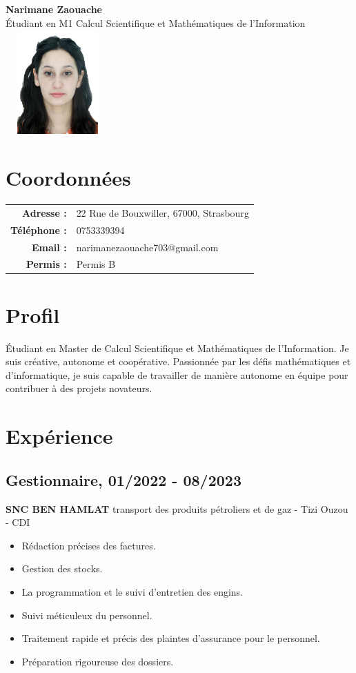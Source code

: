 \documentclass[a4paper,10pt]{article}
\begin{document}
\begin{center}
    \Huge{\textbf{Narimane Zaouache}} \\
    \large{Étudiant en M1 Calcul Scientifique et Mathématiques de l'Information} \\
    \vspace{0.2em}
    \includegraphics[width=4cm, height=4cm]{profile_image.jpg} %
\end{center}

\section*{Coordonnées}
\begin{tabular}{rl}
    \textbf{Adresse :} & 22 Rue de Bouxwiller, 67000, Strasbourg \\
    \textbf{Téléphone :} & 0753339394 \\
    \textbf{Email :} & narimanezaouache703@gmail.com \\
    \textbf{Permis :} & Permis B \\
\end{tabular}

\section*{Profil}
Étudiant en Master de Calcul Scientifique et Mathématiques de l'Information. Je suis créative, autonome et coopérative. Passionnée par les défis mathématiques et d'informatique, je suis capable de travailler de manière autonome en équipe pour contribuer à des projets novateurs.

\section*{Expérience}
\subsection*{Gestionnaire, 01/2022 - 08/2023}
\textbf{SNC BEN HAMLAT} transport des produits pétroliers et de gaz - Tizi Ouzou - CDI
\begin{itemize}[leftmargin=*]
    \item Rédaction précises des factures.
    \item Gestion des stocks.
    \item La programmation et le suivi d'entretien des engins.
    \item Suivi méticuleux du personnel.
    \item Traitement rapide et précis des plaintes d'assurance pour le personnel.
    \item Préparation rigoureuse des dossiers.
\end{itemize}
\end{document}
